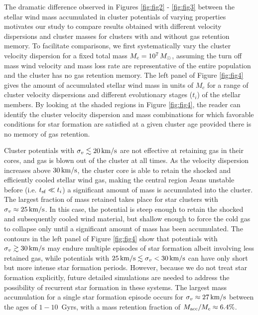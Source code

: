 \documentclass[fleqn,usenatbib]{mnras}
\begin{document}
The dramatic difference observed in Figures \ref{fig:fig2} - \ref{fig:fig3} between the stellar wind mass accumulated  in  cluster potentials of varying properties  motivates our study to compare  results  obtained with different velocity dispersions and cluster masses for clusters with and without gas retention memory. To facilitate  comparisons, we first systematically vary the  cluster velocity dispersion 
for a fixed  total mass $M_{\rm c} = 10^7 \, M_\odot$, assuming the turn off mass wind velocity and mass loss rate are 
representative of  the entire population and the cluster has no gas retention memory.
 The left panel of Figure \ref{fig:fig4} gives the amount of accumulated stellar wind mass in units of $M_c$
for a range of cluster velocity dispersions and different evolutionary stages ($t_i$) of the stellar members. 
By looking at the shaded regions in Figure \ref{fig:fig4}, the reader can identify   the cluster velocity dispersion and mass combinations for which favorable conditions for star formation are satisfied at a given cluster age provided there is no memory of gas retention.

Cluster potentials with $\sigma_v \lesssim 20 \, {\rm km/s}$ are not effective at retaining gas 
in their cores, and gas is blown out of  the cluster at all times. 
As the velocity dispersion increases above  $30 \, {\rm km/s}$, the cluster core is able to retain the shocked and efficiently  cooled stellar wind gas, making  the  central region Jeans unstable before (i.e. $t_{\rm sf} \ll t_i$)  a significant amount of mass is  accumulated  into 
the cluster. The largest fraction of mass  retained  takes place  for star clusters  with $\sigma_v \approx 25 \, {\rm km/s}$. In this case, the potential  is steep enough to retain the shocked and subsequently  cooled wind material, but  shallow enough to force the  cold gas to  collapse only until a significant amount of mass has been accumulated.
The contours in the left panel of Figure \ref{fig:fig4} show that potentials with  $\sigma_v \gtrsim 30 \, {\rm km/s}$  may 
endure multiple episodes of star formation albeit  involving less retained gas, while  
potentials with  $25\, {\rm km/s} \lesssim \sigma_v < 30 \, {\rm km/s}$  can have only short but more intense star formation  periods. 
However, because we do not treat star formation explicitly, future detailed simulations are needed to address the possibility of recurrent star formation in these systems.
The largest mass accumulation for a single star formation episode  occurs for $\sigma_v \approx  27 \, {\rm km/s}$ between the ages of $1-10$~Gyrs, 
with a mass retention fraction of $M_{\rm acc}/M_c \approx 6.4\%$.
\end{document}
